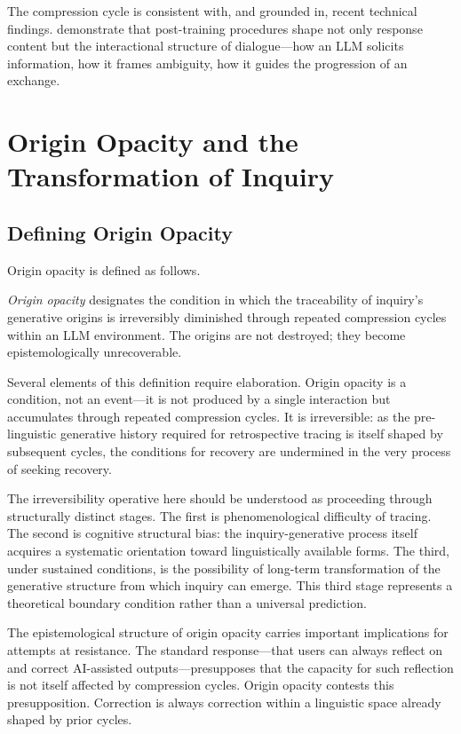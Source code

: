 \documentclass[12pt]{article}
\begin{document}
The compression cycle is consistent with, and grounded in, recent technical findings. \citet{huang2025} demonstrate that post-training procedures shape not only response content but the interactional structure of dialogue---how an LLM solicits information, how it frames ambiguity, how it guides the progression of an exchange.

\section{Origin Opacity and the Transformation of Inquiry}

\subsection{Defining Origin Opacity}

Origin opacity is defined as follows.

\emph{Origin opacity} designates the condition in which the traceability of inquiry's generative origins is irreversibly diminished through repeated compression cycles within an LLM environment. The origins are not destroyed; they become epistemologically unrecoverable.

Several elements of this definition require elaboration. Origin opacity is a condition, not an event---it is not produced by a single interaction but accumulates through repeated compression cycles. It is irreversible: as the pre-linguistic generative history required for retrospective tracing is itself shaped by subsequent cycles, the conditions for recovery are undermined in the very process of seeking recovery.

The irreversibility operative here should be understood as proceeding through structurally distinct stages. The first is phenomenological difficulty of tracing. The second is cognitive structural bias: the inquiry-generative process itself acquires a systematic orientation toward linguistically available forms. The third, under sustained conditions, is the possibility of long-term transformation of the generative structure from which inquiry can emerge. This third stage represents a theoretical boundary condition rather than a universal prediction.

The epistemological structure of origin opacity carries important implications for attempts at resistance. The standard response---that users can always reflect on and correct AI-assisted outputs---presupposes that the capacity for such reflection is not itself affected by compression cycles. Origin opacity contests this presupposition. Correction is always correction within a linguistic space already shaped by prior cycles.
\end{document}
